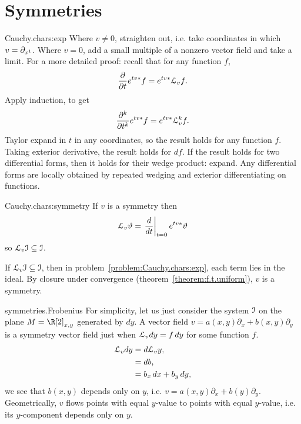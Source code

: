 \section{Symmetries}
\begin{answer}{Cauchy.chars:exp}
Where \(v\ne0\), straighten out, i.e. take coordinates in which \(v=\partial_{x^1}\). 
Where \(v=0\), add a small multiple of a nonzero vector field and take a limit.
For a more detailed proof: recall that for any function \(f\),
\[
\pderiv{}{t}e^{tv*}f=e^{tv*}\LieDer_v f.
\]
Apply induction, to get
\[
\pderiv[k]{}{t}e^{tv*}f=e^{tv*}\LieDer^k_v f.
\]
Taylor expand in \(t\) in any coordinates, so the result holds for any function \(f\).
Taking exterior derivative, the result holds for \(df\).
If the result holds for two differential forms, then it holds for their wedge product: expand.
Any differential forms are locally obtained by repeated wedging and exterior differentiating on functions.
\end{answer}
\begin{answer}{Cauchy.chars:symmetry}
If \(v\) is a symmetry then
\[
\EuScript L_v \vartheta = \left.\frac{d}{dt}\right|_{t=0} e^{tv*}\vartheta
\]
so \(\EuScript L_v \mathcal{I}\subseteq\mathcal{I}\).

If \(\EuScript L_v \mathcal{I}\subseteq\mathcal{I}\), then in problem~\vref{problem:Cauchy.chars:exp}, each term lies in the ideal.
By closure under convergence (theorem~\vref{theorem:f.t.uniform}), \(v\) is a symmetry.
\end{answer}
%
\begin{answer}{symmetries.Frobenius}%
For simplicity, let us just consider the system \(\mathcal{I}\) on the plane \(M=\R[2]_{x,y}\) generated by \(dy\).
A vector field \(v=a(x,y) \partial_x+b(x,y)\partial_y\) is a symmetry vector field just when \(\EuScript L_v dy = f \, dy\) for some function \(f\).
\begin{align*}
\EuScript L_v dy 
&= 
d\EuScript L_v y,
\\
&=
db,
\\
&=
b_x \, dx + b_y \, dy,
\end{align*}
we see that \(b(x,y)\) depends only on \(y\), i.e. \(v=a(x,y)\partial_x+b(y)\partial_y\).
Geometrically, \(v\) flows points with equal \(y\)-value to points with equal \(y\)-value, i.e. its \(y\)-component depends only on \(y\).
\end{answer}
